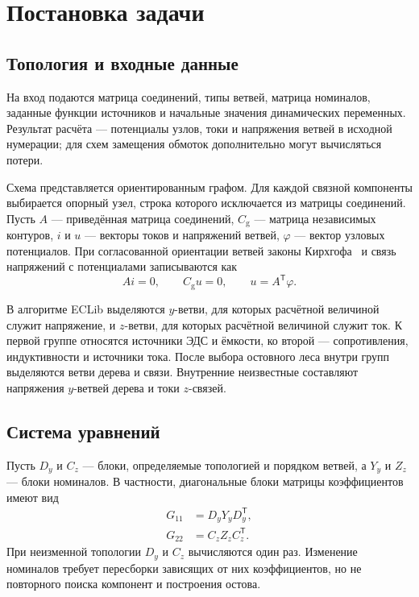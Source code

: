 \documentclass{misisarticle}
\begin{document}
\section{Постановка задачи}

\subsection{Топология и входные данные}

На вход подаются матрица соединений, типы ветвей, матрица номиналов, заданные функции источников и начальные значения динамических переменных. Результат расчёта --- потенциалы узлов, токи и напряжения ветвей в исходной нумерации; для схем замещения обмоток дополнительно могут вычисляться потери.

Схема представляется ориентированным графом. Для каждой связной компоненты выбирается опорный узел, строка которого исключается из матрицы соединений. Пусть $A$ --- приведённая матрица соединений, $C_{\mathrm g}$ --- матрица независимых контуров, $i$ и $u$ --- векторы токов и напряжений ветвей, $\varphi$ --- вектор узловых потенциалов. При согласованной ориентации ветвей законы Кирхгофа~\cite{neyman1981} и связь напряжений с потенциалами записываются как
\begin{equation}
  A i=0,\qquad C_{\mathrm g}u=0,\qquad u=A^{\mathsf T}\varphi.
  \label{eq:kirchhoff}
\end{equation}

В алгоритме ECLib выделяются $y$-ветви, для которых расчётной величиной служит напряжение, и $z$-ветви, для которых расчётной величиной служит ток. К первой группе относятся источники ЭДС и ёмкости, ко второй --- сопротивления, индуктивности и источники тока. После выбора остовного леса внутри групп выделяются ветви дерева и связи. Внутренние неизвестные составляют напряжения $y$-ветвей дерева и токи $z$-связей.

\subsection{Система уравнений}

Пусть $D_y$ и $C_z$ --- блоки, определяемые топологией и порядком ветвей, а $Y_y$ и $Z_z$ --- блоки номиналов. В частности, диагональные блоки матрицы коэффициентов имеют вид
\begin{equation}
\begin{aligned}
  G_{11}&=D_yY_yD_y^{\mathsf T},\\
  G_{22}&=C_zZ_zC_z^{\mathsf T}.
\end{aligned}
\label{eq:blocks}
\end{equation}
При неизменной топологии $D_y$ и $C_z$ вычисляются один раз. Изменение номиналов требует пересборки зависящих от них коэффициентов, но не повторного поиска компонент и построения остова.
\end{document}
